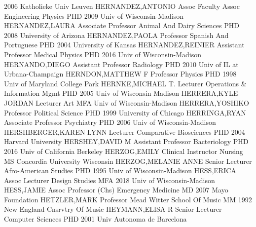\documentclass[
]{article}
\begin{document}
2006 Katholieke Univ Leuven \textbar{} 
\textbar HERNANDEZ,ANTONIO \textbar Assoc Faculty Assoc
\textbar Engineering Physics \textbar PHD 2009 Univ of Wisconsin-Madison
\textbar{}  \textbar HERNANDEZ,LAURA \textbar Associate
Professor \textbar Animal And Dairy Sciences \textbar PHD 2008
University of Arizona \textbar{}  \textbar HERNANDEZ,PAOLA
\textbar Professor \textbar Spanish And Portuguese \textbar PHD 2004
University of Kansas \textbar{}  \textbar HERNANDEZ,REINIER
\textbar Assistant Professor \textbar Medical Physics \textbar PHD 2016
Univ of Wisconsin-Madison \textbar{} 
\textbar HERNANDO,DIEGO \textbar Assistant Professor \textbar Radiology
\textbar PHD 2010 Univ of IL at Urbana-Champaign \textbar{} 
\textbar HERNDON,MATTHEW F \textbar Professor \textbar Physics
\textbar PHD 1998 Univ of Maryland College Park \textbar{} 
\textbar HERNKE,MICHAEL T. \textbar Lecturer \textbar Operations \&
Information Mgmt \textbar PHD 2005 Univ of Wisconsin-Madison \textbar{}
 \textbar HERRERA,KYLE JORDAN \textbar Lecturer \textbar Art
\textbar MFA Univ of Wisconsin-Madison \textbar{} 
\textbar HERRERA,YOSHIKO \textbar Professor \textbar Political Science
\textbar PHD 1999 University of Chicago \textbar{} 
\textbar HERRINGA,RYAN \textbar Associate Professor \textbar Psychiatry
\textbar PHD 2006 Univ of Wisconsin-Madison \textbar{} 
\textbar HERSHBERGER,KAREN LYNN \textbar Lecturer \textbar Comparative
Biosciences \textbar PHD 2004 Harvard University \textbar{} 
\textbar HERSHEY,DAVID M \textbar Assistant Professor
\textbar Bacteriology \textbar PHD 2016 Univ of California Berkeley
\textbar{}  \textbar HERZOG,EMILY \textbar Clinical
Instructor \textbar Nursing \textbar MS Concordia University Wisconsin
\textbar{}  \textbar HERZOG,MELANIE ANNE \textbar Senior
Lecturer \textbar Afro-American Studies \textbar PHD 1995 Univ of
Wisconsin-Madison \textbar{}  \textbar HESS,ERICA
\textbar Assoc Lecturer \textbar Design Studies \textbar MFA 2018 Univ
of Wisconsin-Madison \textbar{}  \textbar HESS,JAMIE
\textbar Assoc Professor (Chs) \textbar Emergency Medicine \textbar MD
2007 Mayo Foundation \textbar{}  \textbar HETZLER,MARK
\textbar Professor \textbar Mead Witter School Of Music \textbar MM 1992
New England Cnsrvtry Of Music \textbar{} 
\textbar HEYMANN,ELISA R \textbar Senior Lecturer \textbar Computer
Sciences \textbar PHD 2001 Univ Autonoma de Barcelona \textbar{}
\end{document}
